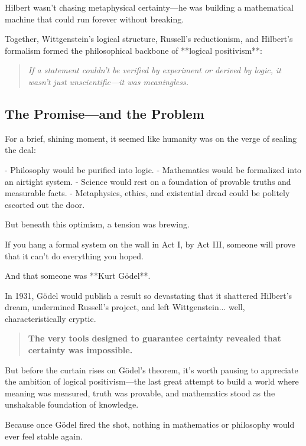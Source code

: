 Hilbert wasn’t chasing metaphysical certainty—he was building a mathematical machine that could run forever without breaking.

Together, Wittgenstein’s logical structure, Russell’s reductionism, and Hilbert’s formalism formed the philosophical backbone of **logical positivism**:

\begin{quote}
\textit{If a statement couldn’t be verified by experiment or derived by logic,  
it wasn’t just unscientific—it was meaningless.}
\end{quote}

\subsection{The Promise—and the Problem}

For a brief, shining moment, it seemed like humanity was on the verge of sealing the deal:

- Philosophy would be purified into logic.
- Mathematics would be formalized into an airtight system.
- Science would rest on a foundation of provable truths and measurable facts.
- Metaphysics, ethics, and existential dread could be politely escorted out the door.

But beneath this optimism, a tension was brewing.

\begin{tcolorbox}[colback=white, colframe=black!50!white, title={Chekhov’s Gun: The Limits of Logic}]
If you hang a formal system on the wall in Act I,  
by Act III, someone will prove that it can’t do everything you hoped.
\end{tcolorbox}

And that someone was **Kurt Gödel**.

In 1931, Gödel would publish a result so devastating that it shattered Hilbert’s dream, undermined Russell’s project, and left Wittgenstein... well, characteristically cryptic.

\begin{quote}
\textbf{The very tools designed to guarantee certainty revealed that certainty was impossible.}
\end{quote}

But before the curtain rises on Gödel’s theorem, it’s worth pausing to appreciate the ambition of logical positivism—the last great attempt to build a world where meaning was measured, truth was provable, and mathematics stood as the unshakable foundation of knowledge.

Because once Gödel fired the shot, nothing in mathematics or philosophy would ever feel stable again.
